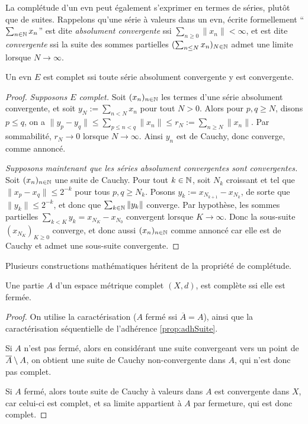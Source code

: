 La complétude d'un evn peut également s'exprimer en termes de séries, plutôt que de suites.
Rappelons qu'une série à valeurs dans un evn, écrite formellement ``$\sum_{n \in \mathbb{N}} x_n$'' est dite \emph{absolument convergente} ssi $\sum_{n\geq 0} \|x_n\| < \infty$, et est dite \emph{convergente} ssi la suite des sommes partielles $(\sum_{n \leq N} x_n)_{N \in \mathbb{N}}$ admet une limite lorsque $N\to \infty$.

\begin{lemma}
\label{lem:serie_Banach}
%
Un evn $E$ est complet ssi toute série absolument convergente y est convergente.   	
\end{lemma}

\begin{proof}
	\emph{Supposons $E$ complet.} Soit $(x_n)_{n \in \mathbb{N}}$ les termes d'une série absolument convergente, et soit $y_N := \sum_{n<N} x_n$ pour tout $N>0$. 
	Alors pour $p,q \geq N$, disons $p\leq q$, on a $\|y_p-y_q\| \leq \sum_{p \leq n < q} \|x_n\| \leq r_N := \sum_{n \geq N} \|x_n\|$. Par sommabilité, $r_N \to 0$ lorsque $N \to \infty$. Ainsi $y_n$ est de Cauchy, donc converge, comme annoncé. 
	
	\emph{Supposons maintenant que les séries absolument convergentes sont convergentes.}
	Soit $(x_n)_{n \in \mathbb{N}}$ une suite de Cauchy. 
	Pour tout $k \in \mathbb{N}$, soit $N_k$ croissant et tel que $\| x_p-x_q \| \leq 2^{-k}$ pour tous $p,q \geq N_k$. 
	Posons $y_k := x_{N_{k+1}}-x_{N_k}$, de sorte que $\| y_k\| \leq 2^{-k}$, et donc que $\sum_{k \in \mathbb{N}} \|y_k\|$ converge. 
	Par hypothèse, les sommes partielles $\sum_{k < K} y_k = x_{N_K}-x_{N_0}$ convergent lorsque $K \to \infty$. Donc la sous-suite $(x_{N_K})_{K\geq 0}$ converge, et donc aussi $(x_n)_{n\in \mathbb{N}}$ comme annoncé car elle est de Cauchy et admet une sous-suite convergente. 
\end{proof}


Plusieurs constructions mathématiques héritent de la propriété de complétude.


\begin{proposition}
\label{prop:fermeComplet}
%
	Une partie $A$ d'un espace métrique complet $(X,d)$, est complète ssi elle est fermée.	
\end{proposition}

\begin{proof}
	On utilise la caractérisation ($A$ fermé ssi $\overline A=A$), ainsi que la caractérisation séquentielle de l'adhérence \cref{prop:adhSuite}.

	Si $A$ n'est pas fermé, alors en considérant une suite convergeant vers un point de $\overline A \setminus A$, on obtient une suite de Cauchy non-convergente dans $A$, qui n'est donc pas complet.
	
	Si $A$ fermé, alors toute suite de Cauchy à valeurs dans $A$ est convergente dans $X$, car celui-ci est complet, et sa limite appartient à $A$ par fermeture, qui est donc complet.
\end{proof}



